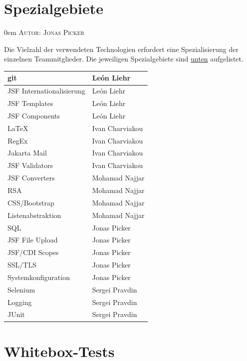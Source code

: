 \documentclass{article}
\makeatletter
\newcommand{\sectionauthor}[1]{
	{\parindent 0em \large \scshape Autor: #1 \par \nobreak \vspace*{1em}}
	\@afterheading
}
\makeatother
\begin{document}
\section{Spezialgebiete}
\sectionauthor{Jonas Picker}
Die Vielzahl der verwendeten Technologien erfordert eine Spezialisierung der einzelnen Teammitglieder. Die jeweiligen Spezialgebiete sind \hyperlink{speziell}{unten} aufgelistet.
\begin{table}[H]
\centering
\hypertarget{speziell}{}
\begin{tabular}{| p{6cm} | p{6cm} |}
	\hline
     	git & León Liehr \\
     	\hline
     	JSF Internationalisierung & León Liehr \\
     	\hline
    	JSF Templates & León Liehr \\
     	\hline
     	JSF Components & León Liehr \\
     	\hline
     	\hline
     	LaTeX & Ivan Charviakou \\
     	\hline
     	RegEx & Ivan Charviakou \\
     	\hline
     	Jakarta Mail & Ivan Charviakou \\
     	\hline
     	JSF Validators & Ivan Charviakou \\
     	\hline
     	\hline
     	JSF Converters & Mohamad Najjar \\
    	\hline
    	 RSA & Mohamad Najjar \\
    	\hline
    	 CSS/Bootstrap & Mohamad Najjar \\
     	\hline
     	Listenabstraktion & Mohamad Najjar \\
     	\hline
     	\hline
     	SQL & Jonas Picker \\
    	\hline
    	JSF File Upload & Jonas Picker \\
     	\hline
     	JSF/CDI Scopes & Jonas Picker \\
     	\hline
     	SSL/TLS & Jonas Picker \\
     	\hline
     	Systemkonfiguration & Jonas Picker \\
     	\hline
     	\hline
     	Selenium & Sergei Pravdin \\
     	\hline
     	Logging & Sergei Pravdin \\
     	\hline
     	JUnit & Sergei Pravdin \\
     	\hline
\end{tabular}
\end{table}

\section{Whitebox-Tests}
\end{document}
